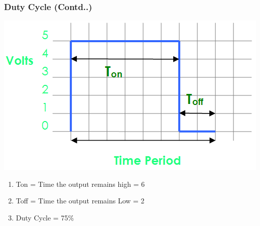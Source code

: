 \documentclass[table,10pt,red]{beamer}	%
\begin{document}
\begin{frame}[shrink = 2]

\frametitle{Duty Cycle (Contd..)} \pause

\includegraphics[width = \linewidth]{75_dutycycle} \pause

\begin{enumerate}[$\checkmark$]

\item<+-|alert@+> Ton = Time the output remains high = 6

\item<+-|alert@+> Toff = Time the output remains Low = 2

\item<+-|alert@+> Duty Cycle = 75\%

\end{enumerate}

\end{frame}
\end{document}

